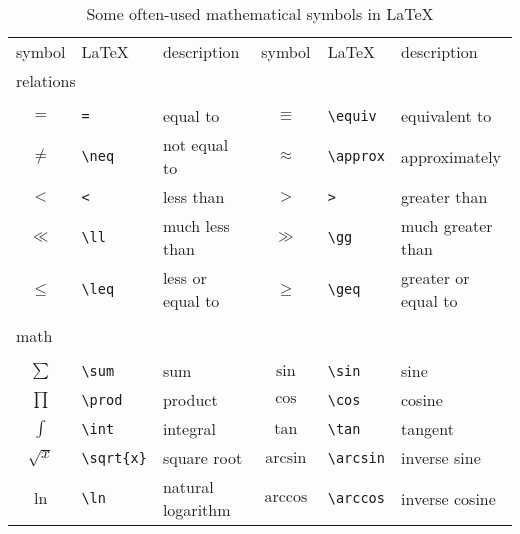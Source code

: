 \label{ch:mathsymbols}

\begin{table}[ht!]\centering\small
\caption{Some often-used mathematical symbols in \LaTeX}\label{tab:mathsymbols}
    \begin{tabular}{cll|cll}
        \toprule
        symbol	        &	 \LaTeX  	        &	 description 	    &	symbol	            &	 \LaTeX  	&	 description\\[+2ex]	
        \multicolumn{2}{l}{relations}			&		                &		                &		                    &		                \\\\
        $=$	            &	\verb|=|	        &	equal to	        &	$\equiv$	        &	\verb|\equiv|	        &	equivalent to	    \\
        $\neq$	        &	\verb|\neq|	        &	not equal to    	&	$\approx$	        &	\verb|\approx|	        &	approximately	    \\
        $<$	            &	\verb|<|	        &	less than	        &	$>$	                &	\verb|>|	            &	greater than	    \\
        $\ll$	        &	\verb|\ll|	        &	much less than	    &	$\gg$	            &	\verb|\gg|	            &	much greater than	\\
        $\leq$	        &	\verb|\leq|	        &	less or equal to	&	$\geq$	            &	\verb|\geq|	            &	greater or equal to	\\
        \\\multicolumn{2}{l}{math}			    &		                &		                &		                    &		                \\\\
        $\sum$	        &	\verb|\sum|	        &	sum	                &	$\sin$	            &	\verb|\sin|	            &	sine	            \\
        $\prod$	        &	\verb|\prod|	    &	product	            &	$\cos$	            &	\verb|\cos|	            &	cosine	            \\
        $\int$	        &	\verb|\int|	        &	integral	        &	$\tan$	            &	\verb|\tan|	            &	tangent	            \\
        $\sqrt{x}$	    &	\verb|\sqrt{x}|	    &	square root	        &	$\arcsin$	        &	\verb|\arcsin|	        &	inverse sine	    \\
        $\ln$	        &	\verb|\ln|	        &	natural logarithm	&	$\arccos$	        &	\verb|\arccos|	        &	inverse cosine	    \\

\end{tabular}
\end{table}
